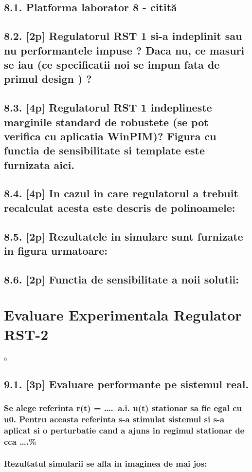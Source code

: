 \documentclass[12pt,english]{article}
\begin{document}
\subsection { 8.1. Platforma laborator 8 - citită }
\subsection { 8.2. [2p] Regulatorul RST 1 si-a indeplinit sau nu performantele impuse ?  Daca nu, ce masuri se iau (ce specificatii noi se impun fata de primul design ) ? }
\subsection { 8.3. [4p] Regulatorul RST 1 indeplineste marginile standard de robustete (se pot verifica cu aplicatia WinPIM)?   Figura cu functia de sensibilitate si template este furnizata aici. }
\subsection { 8.4. [4p] In cazul in care regulatorul a trebuit recalculat acesta este descris de polinoamele: }
\subsection { 8.5. [2p] Rezultatele in simulare sunt furnizate in figura urmatoare: }
\subsection { 8.6. [2p] Functia de sensibilitate a noii solutii: }

\section { Evaluare Experimentala Regulator RST-2 }
a
\subsection { 9.1. [3p] Evaluare performante pe sistemul real. }
\subsubsection { Se alege referinta r(t) = ….  a.i. u(t) stationar sa fie egal cu u0. Pentru aceasta referinta s-a stimulat sistemul si s-a aplicat si o perturbatie cand a ajuns in regimul stationar de cca ….\% }
\subsubsection { Rezultatul simularii se afla in imaginea de mai jos: }
\end{document}
